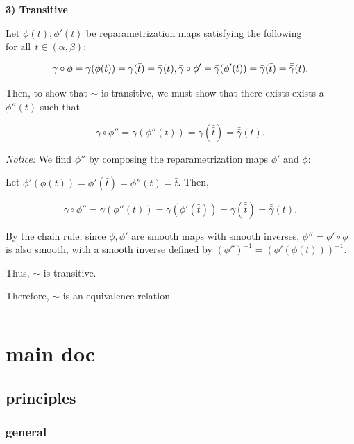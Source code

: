 \documentclass[
]{article}
\begin{document}
\begin{description}
\textbf{3) Transitive}

Let \(\phi(t), \phi'(t)\) be reparametrization maps satisfying the
following \(\text{for all} ~~ t \in (\alpha,\beta)\):

\[
\gamma \circ \phi = \gamma(\phi(t)) = \gamma(\bar{t}) = \bar{\gamma}(t), \\
\bar{\gamma} \circ \phi' = \bar{\gamma}(\phi'(t)) = \bar{\gamma}(\bar{t}) = \bar{\bar{\gamma}}(t).
\]

Then, to show that \(\sim\) is transitive, we must show that there
exists exists a \(\phi''(t)\) such that

\[
\gamma \circ \phi'' = \gamma(\phi''(t)) = \gamma(\bar{\bar{t}}) =  \bar{\bar{\gamma}}(t) \text{.}
\]

\emph{Notice:} We find \(\phi''\) by composing the reparametrization
maps \(\phi'\) and \(\phi\):

Let \(\phi'(\phi(t)) = \phi'(\bar{t}) = \phi''(t) = \bar{\bar{t}}\).
Then,

\[
\gamma \circ \phi'' = \gamma(\phi''(t)) = \gamma(\phi'(\bar{t})) = \gamma(\bar{\bar{t}}) = \bar{\bar{\gamma}}(t) \text{.}
\]

By the chain rule, since \(\phi, \phi'\) are smooth maps with smooth
inverses, \(\phi'' = \phi' \circ \phi\) is also smooth, with a smooth
inverse defined by \((\phi'')^{-1} = (\phi'(\phi(t)))^{-1}\).

Thus, \(\sim\) is transitive.

Therefore, \(\sim\) is an equivalence relation

\[
\tag*{$\square$}
\]
\end{description}

\hypertarget{main-doc}{%
\section{main doc}\label{main-doc}}

\hypertarget{principles}{%
\subsection{principles}\label{principles}}

\hypertarget{general}{%
\subsubsection{general}\label{general}}
\end{document}
